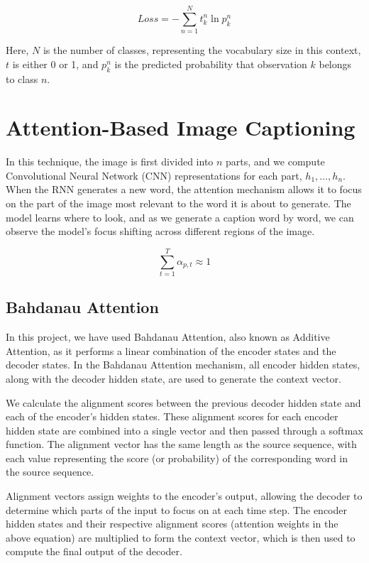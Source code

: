 \documentclass{article}
\begin{document}
\begin{equation}
Loss = - \sum_{n=1}^{N} t^n_k \ln  p^n_k
\end{equation}

Here, \(N\) is the number of classes, representing the vocabulary size in this context, \(t\) is either 0 or 1, and \(p^{n}_{k}\) is the predicted probability that observation \(k\) belongs to class \(n\).

\section{Attention-Based Image Captioning}

In this technique, the image is first divided into \( n \) parts, and we compute Convolutional Neural Network (CNN) representations for each part, \( h_1, \dots, h_n \). When the RNN generates a new word, the attention mechanism allows it to focus on the part of the image most relevant to the word it is about to generate. The model learns where to look, and as we generate a caption word by word, we can observe the model’s focus shifting across different regions of the image.

\begin{equation}
\sum_{t=1}^{T} \alpha_{p,t} \approx 1
\end{equation}

\subsection{Bahdanau Attention}

In this project, we have used Bahdanau Attention, also known as Additive Attention, as it performs a linear combination of the encoder states and the decoder states. In the Bahdanau Attention mechanism, all encoder hidden states, along with the decoder hidden state, are used to generate the context vector.

We calculate the alignment scores between the previous decoder hidden state and each of the encoder’s hidden states. These alignment scores for each encoder hidden state are combined into a single vector and then passed through a softmax function. The alignment vector has the same length as the source sequence, with each value representing the score (or probability) of the corresponding word in the source sequence.

Alignment vectors assign weights to the encoder’s output, allowing the decoder to determine which parts of the input to focus on at each time step. The encoder hidden states and their respective alignment scores (attention weights in the above equation) are multiplied to form the context vector, which is then used to compute the final output of the decoder.
\end{document}
